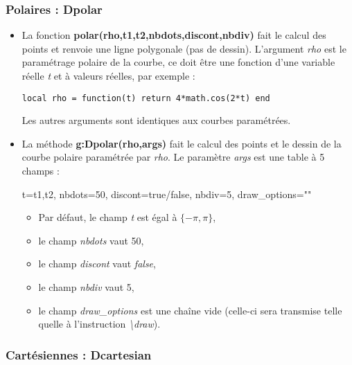 \subsubsection{Polaires : Dpolar}

\begin{itemize}
\item La fonction \textbf{polar(rho,t1,t2,nbdots,discont,nbdiv)} fait le calcul des points et renvoie une ligne polygonale (pas de dessin). L'argument \emph{rho} est le paramétrage polaire de la courbe, ce doit être une fonction d'une variable réelle \emph{t} et à valeurs
  réelles, par exemple :

    \texttt{local rho = function(t) return 4*math.cos(2*t) end}

    Les autres arguments sont identiques aux courbes paramétrées.
\item La méthode \textbf{g:Dpolar(rho,args)} fait le calcul des points et le  dessin de la courbe polaire paramétrée par \emph{rho}.  Le paramètre \emph{args} est une table à 5 champs :

\begin{TeXcode}
  { t={t1,t2}, nbdots=50, discont=true/false, nbdiv=5, draw_options="" }
\end{TeXcode}

  \begin{itemize}
      \item Par défaut, le champ \emph{t} est égal à $\{-\pi,\pi\}$,
      \item le champ \emph{nbdots} vaut 50,
      \item le champ \emph{discont} vaut \emph{false}, 
      \item le champ \emph{nbdiv} vaut 5, 
      \item le champ \emph{draw\_options} est une chaîne vide (celle-ci sera transmise telle quelle à l'instruction \emph{\textbackslash draw}).
  \end{itemize}
\end{itemize}

\subsubsection{Cartésiennes : Dcartesian}

